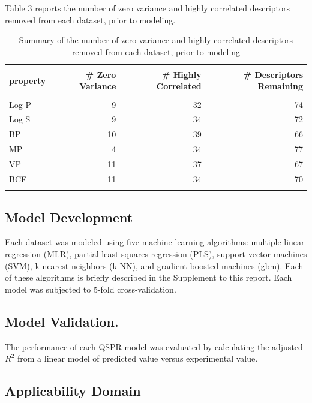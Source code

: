 \documentclass[10pt, letter]{article}
\renewcommand{\=}{\, =\, }
\newcommand{\+}{\, +\, }
\renewcommand{\-}{\, -\, }
\begin{document}
Table 3 reports the number of zero variance and highly correlated descriptors removed from each dataset, prior to modeling.

\begin{table}[H]
\begin{center}
\begin{tabular}{lrrr}
\toprule
&&\\
{\bf property} & {\bf  \# Zero Variance} & {\bf \# Highly Correlated} & {\bf \# Descriptors Remaining}\\
\midrule
&&\\
Log P  &  9 & 32 & 74\\
Log S  &  9 & 34 & 72\\
BP  &  10 & 39 & 66\\
MP  & 4 & 34 & 77\\
VP  & 11 & 37 & 67\\
BCF  & 11 & 34 & 70\\
&&\\
\bottomrule
\end{tabular}
\end{center}
\caption{Summary of the number of zero variance and highly correlated descriptors removed from each dataset, prior to modeling}
\end{table}

\subsection{Model Development}

Each dataset was modeled using five machine learning algorithms: multiple linear regression (MLR), partial least squares regression (PLS), support vector machines (SVM), k-nearest neighbors (k-NN), and gradient boosted machines (gbm). Each of these algorithms is briefly described in the Supplement to this report. Each model was subjected to 5-fold cross-validation.

\subsection{Model Validation.} The performance of each QSPR model  
was evaluated by calculating the adjusted \( R^2\) from a linear model of predicted value versus experimental value.

\subsection{Applicability Domain}
\end{document}
